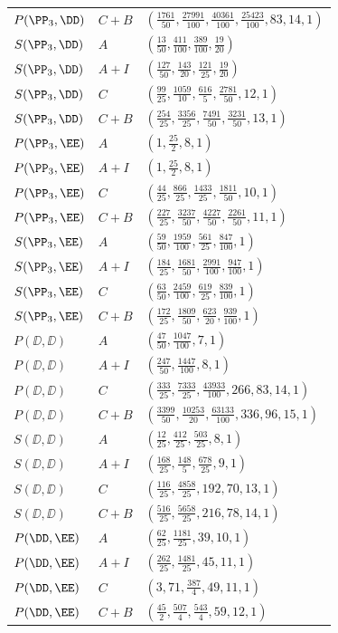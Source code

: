 \begin{longtable}{lll}
$P(\PP_3,\DD)$ & $C+B$ & $(\frac{1761}{50}, \frac{27991}{100}, \frac{40361}{100}, \frac{25423}{100}, 83, 14, 1)$ \\
$S(\PP_3,\DD)$ & $A$ & $(\frac{13}{50}, \frac{411}{100}, \frac{389}{100}, \frac{19}{20})$ \\
$S(\PP_3,\DD)$ & $A+I$ & $(\frac{127}{50}, \frac{143}{20}, \frac{121}{25}, \frac{19}{20})$ \\
$S(\PP_3,\DD)$ & $C$ & $(\frac{99}{25}, \frac{1059}{10}, \frac{616}{5}, \frac{2781}{50}, 12, 1)$ \\
$S(\PP_3,\DD)$ & $C+B$ & $(\frac{254}{25}, \frac{3356}{25}, \frac{7491}{50}, \frac{3231}{50}, 13, 1)$ \\
$P(\PP_3,\EE)$ & $A$ & $(1, \frac{25}{2}, 8, 1)$ \\
$P(\PP_3,\EE)$ & $A+I$ & $(1, \frac{25}{2}, 8, 1)$ \\
$P(\PP_3,\EE)$ & $C$ & $(\frac{44}{25}, \frac{866}{25}, \frac{1433}{25}, \frac{1811}{50}, 10, 1)$ \\
$P(\PP_3,\EE)$ & $C+B$ & $(\frac{227}{25}, \frac{3237}{50}, \frac{4227}{50}, \frac{2261}{50}, 11, 1)$ \\
$S(\PP_3,\EE)$ & $A$ & $(\frac{59}{50}, \frac{1959}{100}, \frac{561}{25}, \frac{847}{100}, 1)$ \\
$S(\PP_3,\EE)$ & $A+I$ & $(\frac{184}{25}, \frac{1681}{50}, \frac{2991}{100}, \frac{947}{100}, 1)$ \\
$S(\PP_3,\EE)$ & $C$ & $(\frac{63}{50}, \frac{2459}{100}, \frac{619}{25}, \frac{839}{100}, 1)$ \\
$S(\PP_3,\EE)$ & $C+B$ & $(\frac{172}{25}, \frac{1809}{50}, \frac{623}{20}, \frac{939}{100}, 1)$ \\
$P(\DD,\DD)$ & $A$ & $(\frac{47}{50}, \frac{1047}{100}, 7, 1)$ \\
$P(\DD,\DD)$ & $A+I$ & $(\frac{247}{50}, \frac{1447}{100}, 8, 1)$ \\
$P(\DD,\DD)$ & $C$ & $(\frac{333}{25}, \frac{7333}{25}, \frac{43933}{100}, 266, 83, 14, 1)$ \\
$P(\DD,\DD)$ & $C+B$ & $(\frac{3399}{50}, \frac{10253}{20}, \frac{63133}{100}, 336, 96, 15, 1)$ \\
$S(\DD,\DD)$ & $A$ & $(\frac{12}{25}, \frac{412}{25}, \frac{503}{25}, 8, 1)$ \\
$S(\DD,\DD)$ & $A+I$ & $(\frac{168}{25}, \frac{148}{5}, \frac{678}{25}, 9, 1)$ \\
$S(\DD,\DD)$ & $C$ & $(\frac{116}{25}, \frac{4858}{25}, 192, 70, 13, 1)$ \\
$S(\DD,\DD)$ & $C+B$ & $(\frac{516}{25}, \frac{5658}{25}, 216, 78, 14, 1)$ \\
$P(\DD,\EE)$ & $A$ & $(\frac{62}{25}, \frac{1181}{25}, 39, 10, 1)$ \\
$P(\DD,\EE)$ & $A+I$ & $(\frac{262}{25}, \frac{1481}{25}, 45, 11, 1)$ \\
$P(\DD,\EE)$ & $C$ & $(3, 71, \frac{387}{4}, 49, 11, 1)$ \\
$P(\DD,\EE)$ & $C+B$ & $(\frac{45}{2}, \frac{507}{4}, \frac{543}{4}, 59, 12, 1)$ \\
\bottomrule
\end{longtable}
\endgroup
